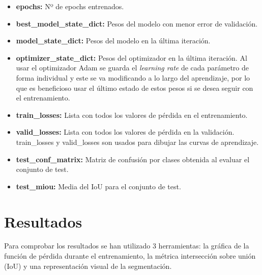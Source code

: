 \begin{itemize}
\item \textbf{epochs:} Nº de epochs entrenados.
\item \textbf{best\_model\_state\_dict:} Pesos del modelo con menor error de validación.
\item \textbf{model\_state\_dict:} Pesos del modelo en la última iteración.
\item \textbf{optimizer\_state\_dict:} Pesos del optimizador en la última iteración. Al usar el optimizador Adam se guarda el \textit{learning rate} de cada parámetro de forma individual y este se va modificando a lo largo del aprendizaje, por lo que es beneficioso usar el último estado de estos pesos si se desea seguir con el entrenamiento.
\item \textbf{train\_losses:} Lista con todos los valores de pérdida en el entrenamiento.
\item \textbf{valid\_losses:} Lista con todos los valores de pérdida en la validación. train\_losses y valid\_losses son usados para dibujar las curvas de aprendizaje.
\item \textbf{test\_conf\_matrix:} Matriz de confusión por clases obtenida al evaluar el conjunto de test.
\item \textbf{test\_miou:} Media del IoU para el conjunto de test.
\end{itemize}

\section{Resultados}\label{sec:initial_system_resultados}

Para comprobar los resultados se han utilizado 3 herramientas: la gráfica de la función de pérdida durante el entrenamiento, la métrica intersección sobre unión (IoU) y una representación visual de la segmentación.



